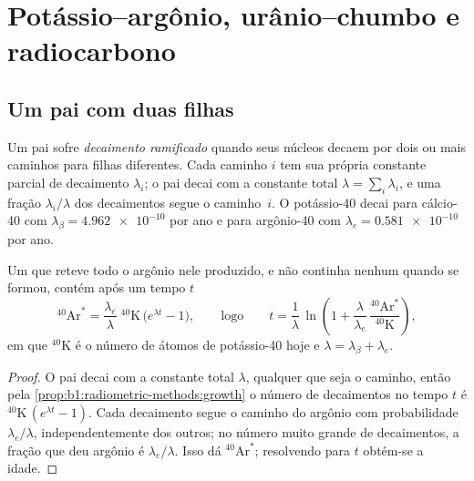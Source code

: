 \section{Potássio--argônio, urânio--chumbo e radiocarbono}\label{sec:b1:radiometric-methods:kar}

\subsection*{Um pai com duas filhas}

\begin{definition}\label{def:b1:radiometric-methods:branching}
Um pai sofre \emph{decaimento ramificado} quando seus núcleos
decaem por dois ou mais caminhos para filhas diferentes. Cada caminho $i$ tem sua própria
constante parcial de decaimento $\lambda_i$; o pai decai com a constante total
$\lambda = \sum_i \lambda_i$, e uma fração $\lambda_i/\lambda$ dos decaimentos segue o
caminho~$i$. O potássio-40 decai para cálcio-40 com $\lambda_\beta =
\num{4.962e-10}$ por ano e para argônio-40 com $\lambda_e = \num{0.581e-10}$ por
ano.
\end{definition}

\begin{proposition}\label{prop:b1:radiometric-methods:kar}
Um  que reteve todo o argônio nele produzido, e não continha nenhum quando se formou,
contém após um tempo $t$
\[
  {}^{40}\mathrm{Ar}^* = \frac{\lambda_e}{\lambda}\;{}^{40}\mathrm{K}\,\bigl(e^{\lambda t} - 1\bigr),
  \qquad\text{logo}\qquad
  t = \frac{1}{\lambda}\,\ln\!\left(1 + \frac{\lambda}{\lambda_e}\,
      \frac{{}^{40}\mathrm{Ar}^*}{{}^{40}\mathrm{K}}\right),
\]
em que ${}^{40}\mathrm{K}$ é o número de átomos de potássio-40 hoje e $\lambda =
\lambda_\beta + \lambda_e$.
\end{proposition}

\begin{proof}
O pai decai com a constante total $\lambda$, qualquer que seja o caminho, então pela
\cref{prop:b1:radiometric-methods:growth} o número de decaimentos no tempo $t$ é
${}^{40}\mathrm{K}\,(e^{\lambda t} - 1)$. Cada decaimento segue o caminho do argônio com
probabilidade $\lambda_e/\lambda$, independentemente dos outros; no número muito grande de
decaimentos, a fração que deu argônio é $\lambda_e/\lambda$. Isso dá ${}^{40}\mathrm{Ar}^*$;
resolvendo para $t$ obtém-se a idade.
\end{proof}

